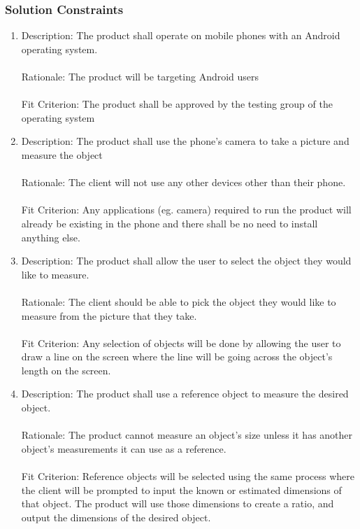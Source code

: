 \documentclass[12pt, titlepage]{article}
\begin{document}
\subsubsection{Solution Constraints}
\begin{enumerate}
\item Description: The product shall operate on mobile phones with an Android operating system.\\ \\
Rationale: The product will be targeting Android users\\ \\
Fit Criterion: The product shall be approved by the testing group of the operating system

\item Description: The product shall use the phone’s camera to take a picture and measure the object\\ \\
Rationale: The client will not use any other devices other than their phone.\\ \\
Fit Criterion: Any applications (eg. camera) required to run the product will already be existing in the phone and there shall be no need to install anything else.

\item Description: The product shall allow the user to select the object they would like to measure.\\ \\
Rationale: The client should be able to pick the object they would like to measure from the picture that they take.\\ \\ 
Fit Criterion: Any selection of objects will be done by allowing the user to draw a line on the screen where the line will be going across the object’s length on the screen.

\item Description: The product shall use a reference object to measure the desired object.\\ \\
Rationale: The product cannot measure an object’s size unless it has another object’s measurements it can use as a reference.\\ \\
Fit Criterion: Reference objects will be selected using the same process where the client will be prompted to input the known or estimated dimensions of that object. The product will use those dimensions to create a ratio, and output the dimensions of the desired object.
\end{enumerate}
\end{document}
